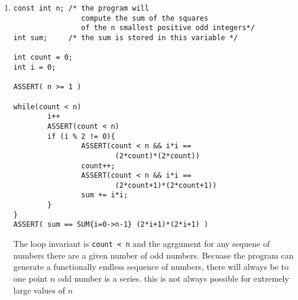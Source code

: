 \documentclass[12pt]{book}
\begin{document}
\begin{enumerate}
        \item \begin{verbatim}
const int n; /* the program will 
                compute the sum of the squares
                of the n smallest positive odd integers*/
int sum;     /* the sum is stored in this variable */

int count = 0;
int i = 0;

ASSERT( n >= 1 )

while(count < n)
        i++
        ASSERT(count < n)
        if (i % 2 != 0){
                ASSERT(count < n && i*i == 
                        (2*count)*(2*count))
                count++;
                ASSERT(count < n && i*i == 
                        (2*count+1)*(2*count+1))
                sum += i*i;
        }
}
ASSERT( sum == SUM{i=0->n-1} (2*i+1)*(2*i+1) )
        \end{verbatim}

        The loop invariant is \texttt{count < n} and the
        agrgument for any sequene of numbers there are a given 
        number of odd numbers. Becuase the program can generate a functionally endless sequence of numbers, there will always be to one
        point $n$ odd number is a series. this is not always 
        possible for extremely large values of $n$
\end{enumerate}
\end{document}
